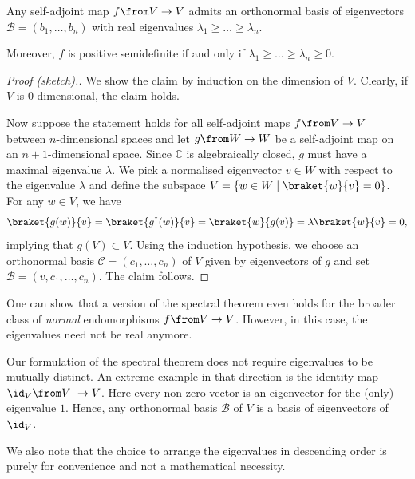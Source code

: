 \documentclass[a4paper,oneside, 12pt]{amsart}
\begin{document}
\begin{theorem}\label{thm:spectral-theorem}
  Any self-adjoint map \(f\from V\to V\) admits an orthonormal basis of eigenvectors \(\mathcal{B}=(b_{1}, \dots , b_{n})\) with real eigenvalues \(\lambda_{1}\geq \dots \geq \lambda_{n}\).

  Moreover, \(f\) is positive semidefinite if and only if \(\lambda_{1} \geq \dots \geq \lambda_{n}\geq 0\).
\end{theorem}
\begin{proof}[Proof (sketch).]
  We show the claim by induction on the dimension of \(V\).
  Clearly, if \(V\) is \(0\)-dimensional, the claim holds.

  Now suppose the statement holds for all self-adjoint maps \(f\from V \to V\) between \(n\)-dimensional spaces and let \(g\from W\to W\) be a self-adjoint map on an \(n+1\)-dimensional space.
  Since \( \mathbb{C}\) is algebraically closed, \(g\) must have a maximal eigenvalue \(\lambda\).
  We pick a normalised eigenvector \(v \in W\)  with respect to the eigenvalue \(\lambda\) and define the subspace \(V=\{w\in W\mid \braket{w}{v} = 0\}\).
  For any \(w\in V\), we have
  \begin{equation*}
    \braket{g(w)}{v} = \braket{g^{\dagger}(w)}{v} = \braket{w}{g(v)} = \lambda \braket{w}{v} = 0,
  \end{equation*}
  implying that \(g(V) \subset V\).
  Using the induction hypothesis, we choose an orthonormal basis \(\mathcal{C} = (c_{1}, \dots , c_{n})\) of \(V\) given by eigenvectors of \(g\) and set \(\mathcal{B} = (v, c_{1}, \dots , c_{n})\).
  The claim follows.
\end{proof}

One can show that a version of the spectral theorem even holds for the broader class of \emph{normal}  endomorphisms \(f \from V\to V\).
However, in this case, the eigenvalues need not be real anymore.

\begin{remark}\label{rmk:spectral-theorem-results}
  Our formulation of the spectral theorem does not require eigenvalues to be mutually distinct.
  An extreme example in that direction is the identity map \(\id_{V} \from V\ \to V\).
  Here every non-zero vector is an eigenvector for the (only) eigenvalue \(1\).
  Hence,  any orthonormal basis \(\mathcal{B}\) of \(V\) is a basis of eigenvectors of \(\id_{V}\).

  We also note that the choice to arrange the eigenvalues in descending order is purely for convenience and not a mathematical necessity.
\end{remark}
\end{document}
